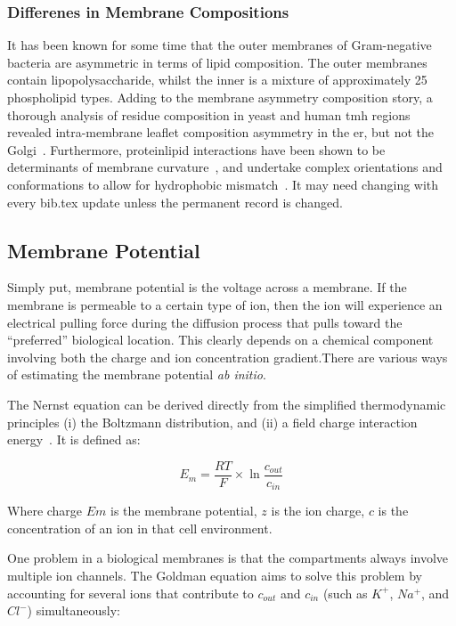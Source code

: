 \subsubsection{Differenes in Membrane Compositions}

It has been known for some time that the outer membranes of Gram-negative bacteria are asymmetric in terms of lipid composition.
The outer membranes contain lipopolysaccharide, whilst the inner is a mixture of approximately 25 phospholipid types.
Adding to the membrane asymmetry composition story, a thorough analysis of residue composition in yeast and human \gls{tmh} regions revealed intra-membrane leaflet composition asymmetry in the \gls{er}, but not the Golgi~\cite{Sharpe2010}.
Furthermore, protein\-lipid interactions have been shown to be determinants of membrane curvature~\cite{Jensen2004}, and undertake complex orientations and conformations to allow for hydrophobic mismatch~\cite{Planque2003}.
It may need changing with every bib.tex update unless the permanent record is changed.

\subsection{Membrane Potential}
Simply put, membrane potential is the voltage across a membrane.
If the membrane is permeable to a certain type of ion, then the ion will experience an electrical pulling force during the diffusion process that pulls toward the ``preferred'' biological location.
This clearly depends on a chemical component involving both the charge and ion concentration gradient.There are various ways of estimating the membrane potential \textit{ ab initio}.

The Nernst equation can be derived directly from the simplified thermodynamic principles (i) the Boltzmann distribution, and (ii) a field charge interaction energy~\cite{Feiner1994}.
It is defined as:

\begin{equation}
{E}_{m}=\frac{RT}{F}\times \ln { \frac{{c}_{out}}{{c}_{in}} }
\end{equation}

Where charge $Em$ is the membrane potential, $z$ is the ion charge, $c$ is the concentration of an ion in that cell environment.

One problem in a biological membranes is that the compartments always  involve multiple ion channels.
The Goldman equation aims to solve this problem by accounting for several ions that contribute to $c_{out}$ and $c_{in}$ (such as $K^+$, $Na^+$, and $Cl^-$) simultaneously:

